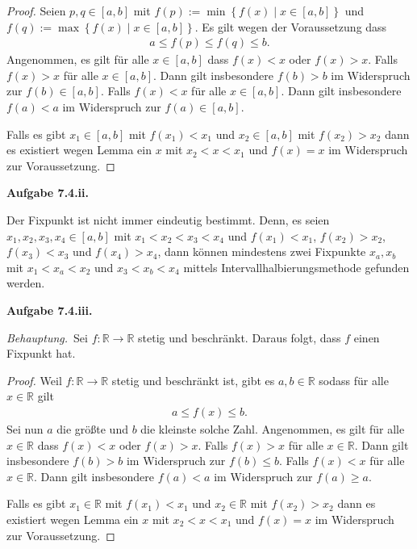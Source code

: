 \documentclass[12pt]{extarticle}
\newcommand{\beh}{\textit{Behauptung.}\ }
\newcommand{\aufgn}[1]{\textbf{Aufgabe #1.}}
\newcommand{\mg}[1]{\mathbb{#1}}
\begin{document}
\begin{proof}
  Seien \(p, q \in \left[ a, b \right]\) mit
  $f(p):=\min \left\{ f(x) \mid x \in \left[ a, b \right]
  \right\}$ und
  $f(q):=\max \left\{ f(x) \mid x \in \left[ a, b \right]
  \right\}$. Es gilt wegen der Voraussetzung dass
\begin{align*}
a \le f(p) \le f(q) \le b.
\end{align*}
Angenommen, es gilt für alle $x \in \left[ a, b
\right]$ dass \(f(x) < x\) oder \(f(x) > x\).
Falls \(f(x) > x\) für alle \(x \in \left[ a, b \right]\).
Dann gilt insbesondere \(f(b) > b\) im Widerspruch zur
\(f(b) \in \left[ a, b \right]\).
Falls \(f(x) < x\) für alle \(x \in \left[ a, b \right]\).
Dann gilt insbesondere \(f(a) < a\) im Widerspruch zur
\(f(a) \in \left[ a, b \right]\).

Falls es gibt \(x_1 \in \left[ a, b \right]\) mit
\(f(x_1) < x_1\) und \(x_2 \in \left[ a, b \right]\) mit
\(f(x_2) > x_2\) dann es existiert wegen Lemma ein
\(x\) mit \(x_2 < x < x_1\) und \(f(x)=x\) im Widerspruch
zur Voraussetzung.

\end{proof}

\aufgn{7.4.ii}

Der Fixpunkt ist nicht immer eindeutig bestimmt.  Denn,
es seien \(x_1, x_2, x_3, x_4 \in \left[ a, b \right]\)
mit \(x_1<x_2<x_3<x_4\) und \(f(x_1)<x_1\), \(f(x_2)>x_2\),
\(f(x_3)<x_3\) und \(f(x_4)>x_4\),  dann können mindestens
zwei Fixpunkte \(x_a, x_b\) mit \(x_1<x_a<x_2\) und
\(x_3<x_b<x_4\) mittels Intervallhalbierungsmethode
gefunden werden.

\aufgn{7.4.iii}

\beh Sei \(f \colon \mg{R} \to \mg{R}\) stetig und
beschränkt.  Daraus folgt, dass \(f\) einen Fixpunkt
hat.

\begin{proof}
  Weil \(f \colon \mg{R} \to \mg{R}\) stetig und
  beschränkt ist, gibt es \(a, b \in \mg{R}\) sodass für
  alle \(x \in \mg{R}\) gilt
\begin{align*}
a \le f(x) \le b.
\end{align*}
Sei nun \(a\) die größte und \(b\) die kleinste solche
Zahl.  Angenommen, es gilt für alle \(x \in \mg{R}\) dass
\(f(x) < x\) oder \(f(x) > x\).  Falls \(f(x) > x\) für alle
\(x \in \mg{R}\).  Dann gilt insbesondere \(f(b) > b\) im
Widerspruch zur \(f(b) \le b\).  Falls \(f(x) < x\) für alle
\(x \in \mg{R}\).  Dann gilt insbesondere \(f(a) < a\) im
Widerspruch zur \(f(a) \ge a\).

Falls es gibt \(x_1 \in \mg{R}\) mit
\(f(x_1) < x_1\) und \(x_2 \in \mg{R}\) mit
\(f(x_2) > x_2\) dann es existiert wegen Lemma ein
\(x\) mit \(x_2 < x < x_1\) und \(f(x)=x\) im Widerspruch
zur Voraussetzung.

\end{proof}
\end{document}
